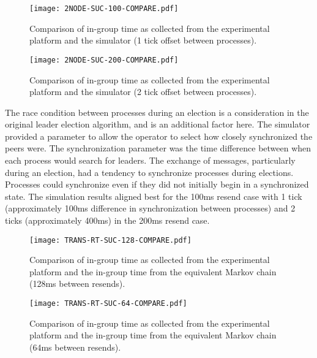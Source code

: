 \begin{figure}
\centering
\begin{minipage}{0.45\textwidth}
    \centering
    \texttt{[image: 2NODE-SUC-100-COMPARE.pdf]}
    \caption{Comparison of in-group time as collected from the experimental platform and the simulator (1 tick offset between processes).}
    \label{fig:COMPARE-SUC-2NODE-100}
\end{minipage}%
\qquad
\begin{minipage}{0.45\textwidth}
    \centering
    \texttt{[image: 2NODE-SUC-200-COMPARE.pdf]}
    \caption{Comparison of in-group time as collected from the experimental platform and the simulator (2 tick offset between processes).}
    \label{fig:COMPARE-SUC-2NODE-200}
\end{minipage}
\end{figure}

The race condition between processes during an election is a consideration in the original leader election algorithm, and is an additional factor here.
The simulator provided a parameter to allow the operator to select how closely synchronized the peers were.
The synchronization parameter was the time difference between when each process would search for leaders.
The exchange of messages, particularly during an election, had a tendency to synchronize processes during elections.
Processes could synchronize even if they did not initially begin in a synchronized state. 
The simulation results aligned best for the 100ms resend case with 1 tick (approximately 100ms difference in synchronization between processes) and 2 ticks (approximately 400ms) in the 200ms resend case.

\begin{figure}
\centering
\begin{minipage}{0.45\textwidth}
    \centering
    \texttt{[image: TRANS-RT-SUC-128-COMPARE.pdf]}
    \caption{Comparison of in-group time as collected from the experimental platform and the in-group time from the equivalent Markov chain (128ms between resends).}
    \label{fig:COMPARE-SUC-TRANS-RT-128}
\end{minipage}%
\qquad
\begin{minipage}{0.45\textwidth}
    \centering
    \texttt{[image: TRANS-RT-SUC-64-COMPARE.pdf]}
    \caption{Comparison of in-group time as collected from the experimental platform and the in-group time from the equivalent Markov chain (64ms between resends).}
    \label{fig:COMPARE-SUC-TRANS-RT-64}
\end{minipage}
\end{figure}


